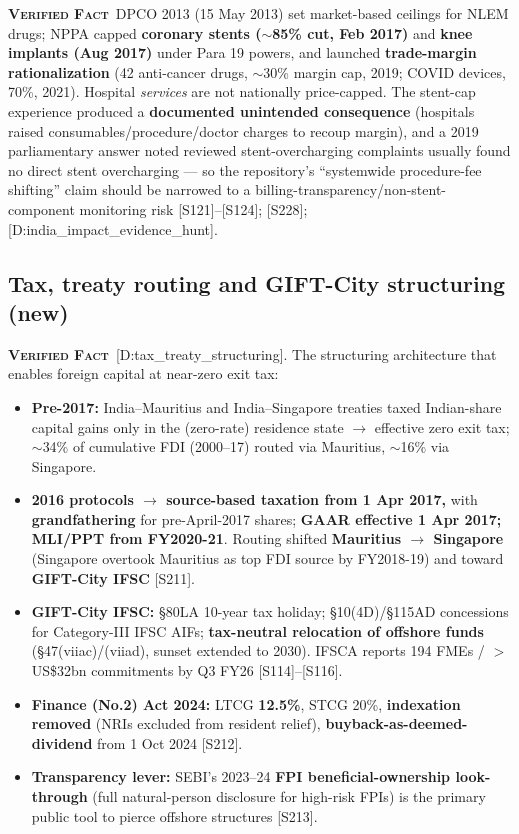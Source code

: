 \documentclass[11pt,a4paper]{article}
\newcommand{\VF}{\textcolor{vfcol}{\textsc{\textbf{Verified Fact}}}}
\newcommand{\cs}[1]{\textnormal{[#1]}}
\begin{document}
\VF\ DPCO 2013 (15 May 2013) set market-based ceilings for NLEM drugs; NPPA capped \textbf{coronary stents ($\sim$85\% cut, Feb 2017)} and \textbf{knee implants (Aug 2017)} under Para 19 powers, and launched \textbf{trade-margin rationalization} (42 anti-cancer drugs, $\sim$30\% margin cap, 2019; COVID devices, 70\%, 2021). Hospital \emph{services} are not nationally price-capped. The stent-cap experience produced a \textbf{documented unintended consequence} (hospitals raised consumables/procedure/doctor charges to recoup margin), and a 2019 parliamentary answer noted reviewed stent-overcharging complaints usually found no direct stent overcharging --- so the repository's ``systemwide procedure-fee shifting'' claim should be narrowed to a billing-transparency/non-stent-component monitoring risk \cs{S121}--\cs{S124}; \cs{S228}; \cs{D:india\_impact\_evidence\_hunt}.

\subsection{Tax, treaty routing and GIFT-City structuring (new)}\label{sec:tax}

\VF\ \cs{D:tax\_treaty\_structuring}. The structuring architecture that enables foreign capital at near-zero exit tax:
\begin{itemize}[leftmargin=1.4em,itemsep=2pt]
\item \textbf{Pre-2017:} India--Mauritius and India--Singapore treaties taxed Indian-share capital gains only in the (zero-rate) residence state $\rightarrow$ effective zero exit tax; $\sim$34\% of cumulative FDI (2000--17) routed via Mauritius, $\sim$16\% via Singapore.
\item \textbf{2016 protocols $\rightarrow$ source-based taxation from 1 Apr 2017,} with \textbf{grandfathering} for pre-April-2017 shares; \textbf{GAAR effective 1 Apr 2017; MLI/PPT from FY2020-21}. Routing shifted \textbf{Mauritius $\rightarrow$ Singapore} (Singapore overtook Mauritius as top FDI source by FY2018-19) and toward \textbf{GIFT-City IFSC} \cs{S211}.
\item \textbf{GIFT-City IFSC:} \S80LA 10-year tax holiday; \S10(4D)/\S115AD concessions for Category-III IFSC AIFs; \textbf{tax-neutral relocation of offshore funds} (\S47(viiac)/(viiad), sunset extended to 2030). IFSCA reports 194 FMEs / $>$US\$32bn commitments by Q3 FY26 \cs{S114}--\cs{S116}.
\item \textbf{Finance (No.2) Act 2024:} LTCG \textbf{12.5\%}, STCG 20\%, \textbf{indexation removed} (NRIs excluded from resident relief), \textbf{buyback-as-deemed-dividend} from 1 Oct 2024 \cs{S212}.
\item \textbf{Transparency lever:} SEBI's 2023--24 \textbf{FPI beneficial-ownership look-through} (full natural-person disclosure for high-risk FPIs) is the primary public tool to pierce offshore structures \cs{S213}.
\end{itemize}
\end{document}
